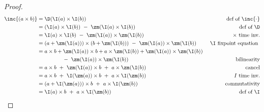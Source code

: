 \begin{proof}
$$
\begin{aligned}
\inc{(a \times b)} &= \D(\I(a) \times \I(b)) & \mbox{def of } \inc{\cdot} \\
             &= (\I(a) \times \I(b)) ~-~  \zm(\I(a) \times \I(b)) & \mbox{def of } \D \\
             &= \I(a) \times \I(b) ~-~  \zm(\I(a)) \times \zm(\I(b)) & \times \mbox{ time inv.}\\
             &= (a + \zm(\I(a))) \times (b + \zm(\I(b))) ~-~ \zm(\I(a)) \times \zm(\I(b)) & \mbox { $\I$ fixpoint equation } \\
             &= a \times b + \zm(\I(a)) \times b + a \times \zm(\I(b)) + \zm(\I(a)) \times \zm(\I(b)) & \\
             &  ~~~~~~~~~~~~~~-~ \zm(\I(a)) \times \zm(\I(b)) & \mbox{bilinearity} \\
             &= a \times b ~+~ \zm(\I(a)) \times b ~+~ a \times \zm(\I(b)) & \mbox{cancel} \\
             &= a \times b ~+~ \I(\zm(a)) \times b ~+~ a \times \I(\zm(b)) & \mbox{$I$ time inv.} \\
             &= (a + \I(\zm(a))) \times b ~+~ a \times \I(\zm(b)) & \mbox{commutativity} \\
             &= \I(a) \times b ~+~ a \times \I(\zm(b)) & \mbox{def of } \I \\
\end{aligned}
$$
\end{proof}

